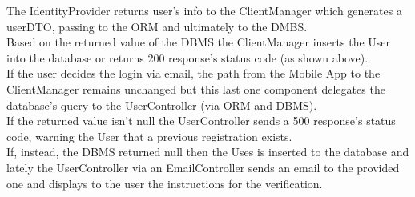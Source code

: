\documentclass[table, 12pt]{article}
\begin{document}
The IdentityProvider returns user's info to the ClientManager which generates a userDTO, passing to the ORM and ultimately to the DMBS.\\
Based on the returned value of the DBMS the ClientManager inserts the User into the database or returns 200 response's status code (as shown above).\\
If the user decides the login via email, the path from the Mobile App to the ClientManager remains unchanged but this last one component delegates the database's query to the UserController (via ORM and DBMS).\\
If the returned value isn't null the UserController sends a 500 response's status code, warning the User that a previous registration exists.\\
If, instead, the DBMS returned null then the Uses is inserted to the database and lately the UserController via an EmailController sends an email to the provided one and displays to the user the instructions for the verification.\\
\end{document}
